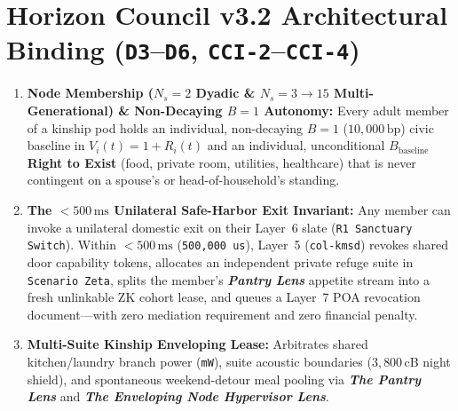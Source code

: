 \section{Horizon Council v3.2 Architectural Binding (\texttt{D3}--\texttt{D6}, \texttt{CCI-2}--\texttt{CCI-4})}
\begin{enumerate}
    \item \textbf{Node Membership ($N_s = 2$ Dyadic \& $N_s = 3 \to 15$ Multi-Generational) \& Non-Decaying $B = 1$ Autonomy:} Every adult member of a kinship pod holds an individual, non-decaying $B = 1$ ($10{,}000\,\mathrm{bp}$) civic baseline in $V_i(t) = 1 + R_i(t)$ and an individual, unconditional \textbf{$B_{\mathrm{baseline}}$ Right to Exist} (food, private room, utilities, healthcare) that is never contingent on a spouse's or head-of-household's standing.
    \item \textbf{The $<500\,\mathrm{ms}$ Unilateral Safe-Harbor Exit Invariant:} Any member can invoke a unilateral domestic exit on their Layer~6 slate (\texttt{R1 Sanctuary Switch}). Within $<500\,\mathrm{ms}$ (\texttt{500,000 us}), Layer~5 (\texttt{col-kmsd}) revokes shared door capability tokens, allocates an independent private refuge suite in \texttt{Scenario Zeta}, splits the member's \textbf{\textit{Pantry Lens}} appetite stream into a fresh unlinkable ZK cohort lease, and queues a Layer~7 POA revocation document---with zero mediation requirement and zero financial penalty.
    \item \textbf{Multi-Suite Kinship Enveloping Lease:} Arbitrates shared kitchen/laundry branch power (\texttt{mW}), suite acoustic boundaries ($3{,}800\,\mathrm{cB}$ night shield), and spontaneous weekend-detour meal pooling via \textbf{\textit{The Pantry Lens}} and \textbf{\textit{The Enveloping Node Hypervisor Lens}}.
\end{enumerate}

